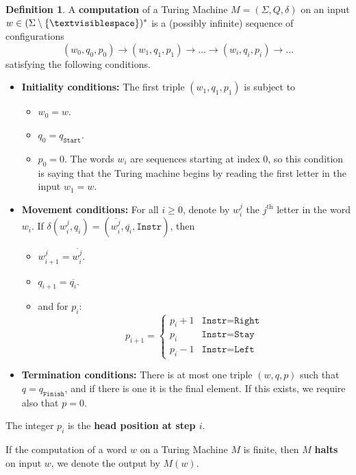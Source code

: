\documentclass[12pt]{article}
\theoremstyle{plain}
\theoremstyle{definition}
\newtheorem{defn}[thm]{Definition} %
\newcommand{\lto}{\longrightarrow}
\newcommand{\blank}{\textvisiblespace}
\begin{document}
	\begin{defn}\label{def:computation}
		A \textbf{computation} of a Turing Machine $M = (\Sigma, Q, \delta)$ on an input $w \in (\Sigma\setminus \{ \blank\})^\ast$ is a (possibly infinite) sequence of configurations
		\begin{equation}
			(w_0, q_0, p_0) \lto (w_1, q_1, p_1) \lto \ldots \lto (w_i, q_i, p_i) \lto \ldots
		\end{equation}
		satisfying the following conditions.
		\begin{itemize}
			\item \textbf{Initiality conditions:} The first triple $(w_1, q_1, p_1)$ is subject to
			\begin{itemize}
				\item $w_0 = w$.
				\item $q_0 = q_{\texttt{Start}}$.
				\item $p_0 = 0$. The words $w_i$ are sequences starting at index $0$, so this condition is saying that the Turing machine begins by reading the first letter in the input $w_1 = w$.
			\end{itemize}
			\item \textbf{Movement conditions:} For all $i \geq 0$, denote by $w_i^j$ the $j^{\text{th}}$ letter in the word $w_i$. If $\delta(w_i^j, q_i) = (\overline{w_i^j}, \overline{q_i}, \texttt{Instr})$, then
			\begin{itemize}
				\item $w_{i+1}^j = \overline{w_i^j}$.
				\item $q_{i+1} = \overline{q_i}$.
				\item and for $p_i$:
				\begin{equation}
					p_{i+1} =
					\begin{cases}
						p_i + 1& \texttt{Instr} = \texttt{Right}\\
						p_i & \texttt{Instr} = \texttt{Stay}\\
						p_i - 1 & \texttt{Instr} = \texttt{Left}
					\end{cases}
				\end{equation}
			\end{itemize}
			\item \textbf{Termination conditions: } There is at most one triple $(w,q,p)$ such that $q = q_{\texttt{Finish}}$, and if there is one it is the final element. If this exists, we require also that $p = 0$.
		\end{itemize}
		The integer $p_i$ is the \textbf{head position at step $i$}.
		
		If the computation of a word $w$ on a Turing Machine $M$ is finite, then $M$ \textbf{halts} on input $w$, we denote the output by $M(w)$.
	\end{defn}
	
\end{document}
